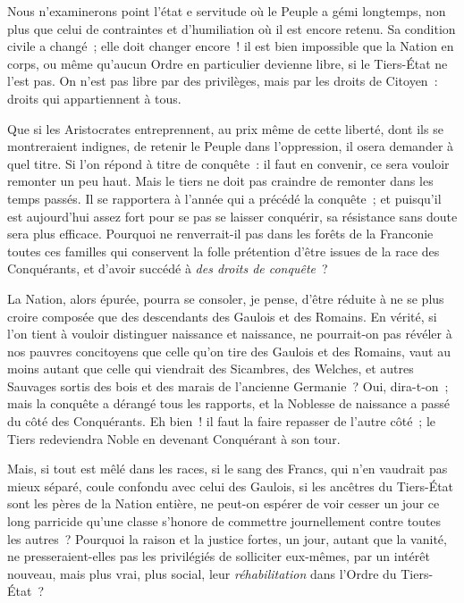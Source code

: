 \documentclass[french,twoside]{book} %
\newcommand\chaptercont{} %
\begin{document}
\chaptercont
\noindent Nous n’examinerons point l’état e servitude où le Peuple a gémi longtemps, non plus que celui de contraintes et d’humiliation où il est encore retenu. Sa condition civile a changé ; elle doit changer encore ! il est bien impossible que la Nation en corps, ou même qu’aucun Ordre en particulier devienne libre, si le Tiers-État ne l’est pas. On n’est pas libre par des privilèges, mais par les droits de Citoyen : droits qui appartiennent à tous.\par
Que si les Aristocrates entreprennent, au prix même de cette liberté, dont ils se montreraient indignes, de retenir le Peuple dans l’oppression, il osera demander à quel titre. Si l’on répond à titre de conquête : il faut en convenir, ce sera vouloir remonter un peu haut. Mais le tiers ne doit pas craindre de remonter dans les temps passés. Il se rapportera à l’année qui a précédé la conquête ; et puisqu’il est aujourd’hui assez fort pour se pas se laisser conquérir, sa résistance sans doute sera plus efficace. Pourquoi ne renverrait-il pas dans les forêts de la Franconie toutes ces familles qui conservent la folle prétention d’être issues de la race des Conquérants, et d’avoir succédé à {\itshape des droits de conquête} ?\par
La Nation, alors épurée, pourra se consoler, je pense, d’être réduite à ne se plus croire composée que des descendants des Gaulois et des Romains. En vérité, si l’on tient à vouloir distinguer naissance et naissance, ne pourrait-on pas révéler à nos pauvres concitoyens que celle qu’on tire des Gaulois et des Romains, vaut au moins autant que celle qui viendrait des Sicambres, des Welches, et autres Sauvages sortis des bois et des marais de l’ancienne Germanie ? Oui, dira-t-on ; mais la conquête a dérangé tous les rapports, et la Noblesse de naissance a passé du côté des Conquérants. Eh bien ! il faut la faire repasser de l’autre côté ; le Tiers redeviendra Noble en devenant Conquérant à son tour.\par
Mais, si tout est mêlé dans les races, si le sang des Francs, qui n’en vaudrait pas mieux séparé, coule confondu avec celui des Gaulois, si les ancêtres du Tiers-État sont les pères de la Nation entière, ne peut-on espérer de voir cesser un jour ce long parricide qu’une classe s’honore de commettre journellement contre toutes les autres ? Pourquoi la raison et la justice fortes, un jour, autant que la vanité, ne presseraient-elles pas les privilégiés de solliciter eux-mêmes, par un intérêt nouveau, mais plus vrai, plus social, leur {\itshape réhabilitation} dans l’Ordre du Tiers-État ?\par
\end{document}
